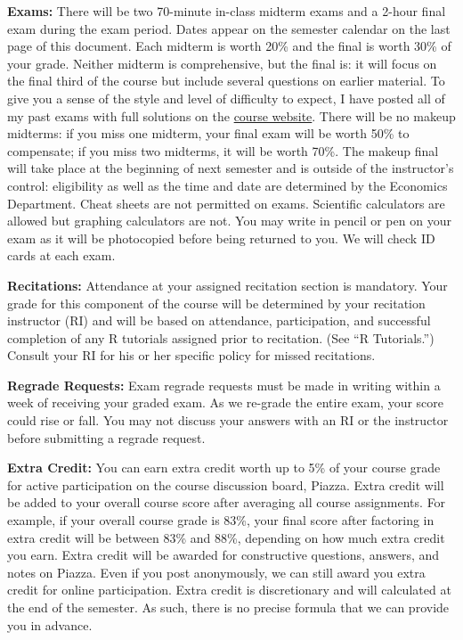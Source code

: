\documentclass[11pt, letterpaper]{article}
\begin{document}
\medskip

\noindent \textbf{Exams:} 
There will be two 70-minute in-class midterm exams and a 2-hour final exam during the exam period.
Dates appear on the semester calendar on the last page of this document. 
Each midterm is worth 20\% and the final is worth 30\% of your grade.
Neither midterm is comprehensive, but the final is: it will focus on the final third of the course but include several questions on earlier material.
To give you a sense of the style and level of difficulty to expect, I have posted all of my past exams with full solutions on the \href{http://ditraglia.com/Econ103Public}{course website}.
There will be no makeup midterms: if you miss one midterm, your final exam will be worth 50\% to compensate; if you miss two midterms, it will be worth 70\%.
The makeup final will take place at the beginning of next semester and is outside of the instructor's control: eligibility as well as the time and date are determined by the Economics Department. 
Cheat sheets are not permitted on exams.
Scientific calculators are allowed but graphing calculators are not. 
You may write in pencil or pen on your exam as it will be photocopied before being returned to you.
We will check ID cards at each exam.

\medskip
 
\noindent \textbf{Recitations:} Attendance at your assigned recitation section is mandatory. Your grade for this component of the course will be determined by your recitation instructor (RI) and will be based on attendance, participation, and successful completion of any R tutorials assigned prior to recitation. (See ``R Tutorials.'') Consult your RI for his or her specific policy for missed recitations.

\medskip

\noindent \textbf{Regrade Requests:}
Exam regrade requests must be made in writing within a week of receiving your graded exam. 
As we re-grade the entire exam, your score could rise or fall. 
You may not discuss your answers with an RI or the instructor before submitting a regrade request. 


\medskip

\noindent \textbf{Extra Credit:} 
You can earn extra credit worth up to 5\% of your course grade for active participation on the course discussion board, Piazza.
Extra credit will be added to your overall course score after averaging all course assignments.
For example, if your overall course grade is 83\%, your final score after factoring in extra credit will be between 83\% and 88\%, depending on how much extra credit you earn. 
Extra credit will be awarded for constructive questions, answers, and notes on Piazza.
Even if you post anonymously, we can still award you extra credit for online participation.
Extra credit is discretionary and will calculated at the end of the semester.
As such, there is no precise formula that we can provide you in advance.
\end{document}
